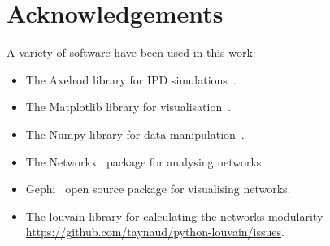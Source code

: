 \documentclass{article}
\theoremstyle{definition}
\begin{document}
\section{Acknowledgements}

A variety of software have been used in this work:

\begin{itemize}
    \item The Axelrod library for IPD simulations~\cite{axelrodproject}.
    \item The Matplotlib library for visualisation~\cite{hunter2007matplotlib}.
    \item The Numpy library for data manipulation~\cite{walt2011numpy}.
    \item The Networkx~\cite{networkx} package for analysing networks.
    \item Gephi~\cite{ICWSM09154} open source package for visualising networks.
    \item The louvain library for calculating the networks modularity \url{https://github.com/taynaud/python-louvain/issues}.
\end{itemize}

\newpage


\end{document}
